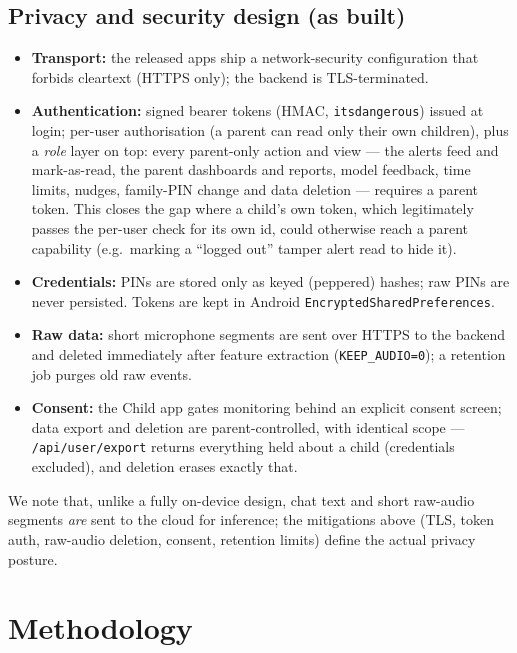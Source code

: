 \documentclass[11pt,a4paper]{article}
\begin{document}
\subsection{Privacy and security design (as built)}
\begin{itemize}[leftmargin=1.4em]
  \item \textbf{Transport:} the released apps ship a network-security configuration
        that forbids cleartext (HTTPS only); the backend is TLS-terminated.
  \item \textbf{Authentication:} signed bearer tokens (HMAC, \texttt{itsdangerous})
        issued at login; per-user authorisation (a parent can read only their own
        children), plus a \emph{role} layer on top: every parent-only action and view
        --- the alerts feed and mark-as-read, the parent dashboards and reports, model
        feedback, time limits, nudges, family-PIN change and data deletion --- requires
        a parent token. This closes the gap where a child's own token, which legitimately
        passes the per-user check for its own id, could otherwise reach a parent
        capability (e.g.\ marking a ``logged out'' tamper alert read to hide it).
  \item \textbf{Credentials:} PINs are stored only as keyed (peppered) hashes; raw
        PINs are never persisted. Tokens are kept in Android
        \texttt{EncryptedSharedPreferences}.
  \item \textbf{Raw data:} short microphone segments are sent over HTTPS to the
        backend and deleted immediately after feature extraction
        (\texttt{KEEP\_AUDIO=0}); a retention job purges old raw events.
  \item \textbf{Consent:} the Child app gates monitoring behind an explicit consent
        screen; data export and deletion are parent-controlled, with identical scope
        --- \texttt{/api/user/export} returns everything held about a child
        (credentials excluded), and deletion erases exactly that.
\end{itemize}
We note that, unlike a fully on-device design, chat text and short raw-audio
segments \emph{are} sent to the cloud for inference; the mitigations above (TLS, token auth,
raw-audio deletion, consent, retention limits) define the actual privacy posture.

\section{Methodology}
\end{document}
